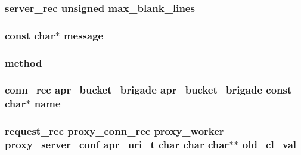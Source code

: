\subsubsection[{\texorpdfstring{max\+\_\+blank\+\_\+lines}{max_blank_lines}}]{ {\bf server\+\_\+rec} unsigned max\+\_\+blank\+\_\+lines}\hypertarget{group__MOD__PROXY_ga36f42cf8af907c11a4c0c9cf25b50959}{}\label{group__MOD__PROXY_ga36f42cf8af907c11a4c0c9cf25b50959}
\subsubsection[{\texorpdfstring{message}{message}}]{ const char$\ast$ message}\hypertarget{group__MOD__PROXY_ga0c50798f43a2b6a973e0faf3b4038d54}{}\label{group__MOD__PROXY_ga0c50798f43a2b6a973e0faf3b4038d54}
\subsubsection[{\texorpdfstring{method}{method}}]{ method}\hypertarget{group__MOD__PROXY_gac5d23b9808ef0ec4f79fcef6411b6f4e}{}\label{group__MOD__PROXY_gac5d23b9808ef0ec4f79fcef6411b6f4e}
\subsubsection[{\texorpdfstring{name}{name}}]{ {\bf conn\+\_\+rec} {\bf apr\+\_\+bucket\+\_\+brigade} {\bf apr\+\_\+bucket\+\_\+brigade} const char$\ast$ name}\hypertarget{group__MOD__PROXY_ga0a127f08740aaf3e315dcd155ddbf080}{}\label{group__MOD__PROXY_ga0a127f08740aaf3e315dcd155ddbf080}
\subsubsection[{\texorpdfstring{old\+\_\+cl\+\_\+val}{old_cl_val}}]{ {\bf request\+\_\+rec} {\bf proxy\+\_\+conn\+\_\+rec} {\bf proxy\+\_\+worker} {\bf proxy\+\_\+server\+\_\+conf} {\bf apr\+\_\+uri\+\_\+t} char char char$\ast$$\ast$ old\+\_\+cl\+\_\+val}\hypertarget{group__MOD__PROXY_ga6e7929a1d8d93eba88370a05a26ab37b}{}\label{group__MOD__PROXY_ga6e7929a1d8d93eba88370a05a26ab37b}
